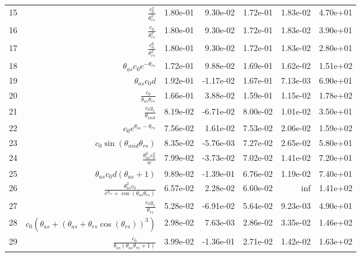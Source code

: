 \begin{tabularx}{\textwidth}{lRRRRRl}
15  &  $ \displaystyle\frac{c_{0}^{2}}{\theta_{rs}^{2}} $  &  1.80e-01  &  9.30e-02  &  1.72e-01  &  1.83e-02  &  4.70e+01  \\ 
16  &  $ \displaystyle\frac{c_{0}}{\theta_{rs}^{2}} $  &  1.80e-01  &  9.30e-02  &  1.72e-01  &  1.83e-02  &  3.90e+01  \\ 
17  &  $ \displaystyle\frac{c_{0}^{6}}{\theta_{rs}^{2}} $  &  1.80e-01  &  9.30e-02  &  1.72e-01  &  1.83e-02  &  2.80e+01  \\ 
18  &  $ \theta_{as} c_{0} e^{- \theta_{rs}} $  &  1.72e-01  &  9.88e-02  &  1.69e-01  &  1.62e-02  &  1.51e+02  \\ 
19  &  $ \theta_{as} c_{0} d $  &  1.92e-01  &  -1.17e-02  &  1.67e-01  &  7.13e-03  &  6.90e+01  \\ 
20  &  $ \displaystyle\frac{c_{0}}{\theta_{as} \theta_{rs}} $  &  1.66e-01  &  3.88e-02  &  1.59e-01  &  1.15e-02  &  1.78e+02  \\ 
21  &  $ \displaystyle\frac{c_{0} y_c}{\theta_{mid}} $  &  8.19e-02  &  -6.71e-02  &  8.00e-02  &  1.01e-02  &  3.50e+01  \\ 
22  &  $ c_{0} e^{\theta_{as} - \theta_{rs}} $  &  7.56e-02  &  1.61e-02  &  7.53e-02  &  2.06e-02  &  1.59e+02  \\ 
23  &  $ c_{0} \sin{\left(\theta_{mid} \theta_{rs} \right)} $  &  8.35e-02  &  -5.76e-03  &  7.27e-02  &  2.65e-02  &  5.80e+01  \\ 
24  &  $ \displaystyle\frac{\theta_{as}^{2} c_{0}^{2}}{w} $  &  7.99e-02  &  -3.73e-02  &  7.02e-02  &  1.41e-02  &  7.20e+01  \\ 
25  &  $ \theta_{as} c_{0} d \left(\theta_{as} + 1\right) $  &  9.89e-02  &  -1.39e-01  &  6.76e-02  &  1.19e-02  &  7.40e+01  \\ 
26  &  $ \displaystyle\frac{\theta_{as}^{2} c_{0}}{e^{\theta_{rs}} + \cos{\left(\theta_{as} \theta_{rs} \right)}} $  &  6.57e-02  &  2.28e-02  &  6.60e-02  &  inf  &  1.41e+02  \\ 
27  &  $ \displaystyle\frac{c_{0} y_c}{\theta_{rs}} $  &  5.28e-02  &  -6.91e-02  &  5.64e-02  &  9.23e-03  &  4.90e+01  \\ 
28  &  $ c_{0} \left(\theta_{as} + \left(\theta_{as} + \theta_{rs} \cos{\left(\theta_{rs} \right)}\right)^{3}\right) $  &  2.98e-02  &  7.63e-03  &  2.86e-02  &  3.35e-02  &  1.46e+02  \\ 
29  &  $ \displaystyle\frac{c_{0}}{\theta_{as} \left(\theta_{as} \theta_{rs} + 1\right)} $  &  3.99e-02  &  -1.36e-01  &  2.71e-02  &  1.42e-02  &  1.63e+02  \\ 

\end{tabularx}
